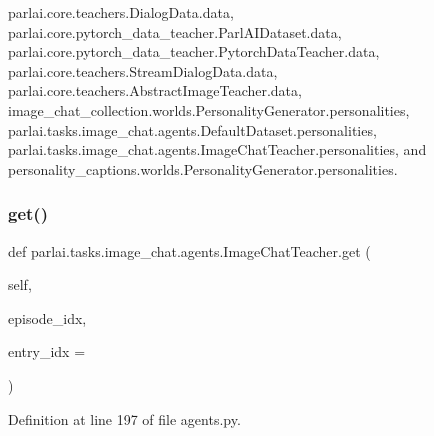 parlai.\+core.\+teachers.\+Dialog\+Data.\+data, parlai.\+core.\+pytorch\+\_\+data\+\_\+teacher.\+Parl\+A\+I\+Dataset.\+data, parlai.\+core.\+pytorch\+\_\+data\+\_\+teacher.\+Pytorch\+Data\+Teacher.\+data, parlai.\+core.\+teachers.\+Stream\+Dialog\+Data.\+data, parlai.\+core.\+teachers.\+Abstract\+Image\+Teacher.\+data, image\+\_\+chat\+\_\+collection.\+worlds.\+Personality\+Generator.\+personalities, parlai.\+tasks.\+image\+\_\+chat.\+agents.\+Default\+Dataset.\+personalities, parlai.\+tasks.\+image\+\_\+chat.\+agents.\+Image\+Chat\+Teacher.\+personalities, and personality\+\_\+captions.\+worlds.\+Personality\+Generator.\+personalities.

\mbox{\label{classparlai_1_1tasks_1_1image__chat_1_1agents_1_1ImageChatTeacher_ac7212c1001ab9c5027ae305ffdc9298f}} 
\subsubsection{\texorpdfstring{get()}{get()}}
{\footnotesize\ttfamily def parlai.\+tasks.\+image\+\_\+chat.\+agents.\+Image\+Chat\+Teacher.\+get (\begin{DoxyParamCaption}\item[{}]{self,  }\item[{}]{episode\+\_\+idx,  }\item[{}]{entry\+\_\+idx = {} }\end{DoxyParamCaption})}



Definition at line 197 of file agents.\+py.



